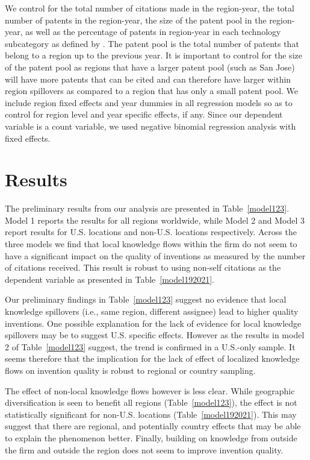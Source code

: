 \documentclass[12pt,letterpaper]{article}
\begin{document}
We control for the total number of citations made in the region-year, the total number of patents in the region-year, the size of the patent pool in the region-year, as well as the percentage of patents in region-year in each technology subcategory as defined by \cite*{Hall2001a}. The patent pool is the total number of patents that belong to a region up to the previous year. It is important to control for the size of the patent pool as  regions that have a larger patent pool (such as San Jose) will have more patents that can be cited and can therefore have larger within region spillovers as compared to a region that has only a small patent pool. We include region fixed effects and year dummies in all regression models so as to control for region level and year specific effects, if any. Since our dependent variable is a count variable, we used negative binomial regression analysis with fixed effects. \par

\section*{Results}
The preliminary results from our analysis are presented in Table~\ref{model123}. Model 1 reports the results for all regions worldwide, while Model 2 and Model 3 report results for U.S. locations and non-U.S. locations respectively. Across the three models we find that local knowledge flows within the firm do not seem to have a significant impact on the quality of inventions as measured by the number of citations received. This result is robust to using non-self citations as the dependent variable as presented in Table~\ref{model192021}. \par
Our preliminary findings in Table~\ref{model123} suggest no evidence that local knowledge spillovers (i.e., same region, different assignee) lead to higher quality inventions.  One possible explanation for the lack of evidence for local knowledge spillovers may be to suggest U.S. specific effects. However as the results in model 2 of Table~\ref{model123} suggest, the trend is confirmed in a U.S.-only sample. It seems therefore that the implication for the lack of effect of localized knowledge flows on invention quality is robust to regional or country sampling. \par
The effect of non-local knowledge flows however is less clear. While geographic diversification is seen to benefit all regions (Table~\ref{model123}), the effect is not statistically significant for non-U.S. locations (Table~\ref{model192021}). This may suggest that there are regional, and potentially country effects that may be able to explain the phenomenon better. Finally, building on knowledge from outside the firm and outside the region does not seem to improve invention quality.\par
\end{document}
